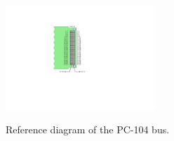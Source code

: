 \begin{figure}[!ht]
    \begin{center}
        \includegraphics[width=0.5\textwidth]{figures/pc104-diagram}
        \label{fig:pc104-diagram}
        \caption{Reference diagram of the PC-104 bus.}
    \end{center}
\end{figure}

